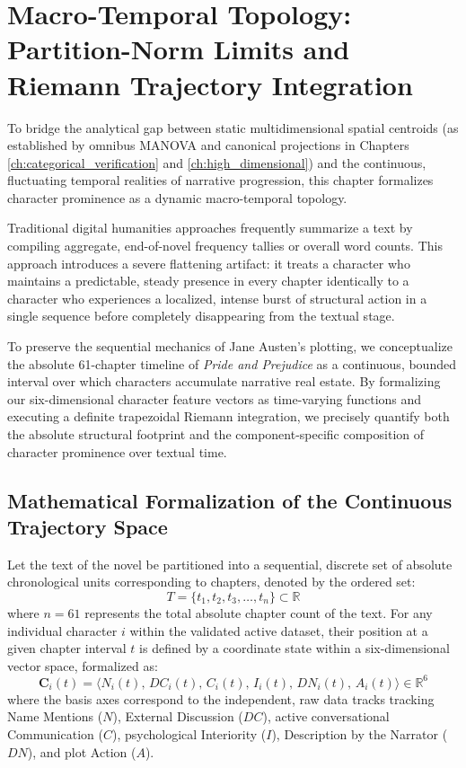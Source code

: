 \chapter{Macro-Temporal Topology: Partition-Norm Limits and Riemann Trajectory Integration}
\label{ch:riemann_calculus}

To bridge the analytical gap between static multidimensional spatial centroids (as established by omnibus MANOVA and canonical projections in Chapters \ref{ch:categorical_verification} and \ref{ch:high_dimensional}) and the continuous, fluctuating temporal realities of narrative progression, this chapter formalizes character prominence as a dynamic macro-temporal topology. 

Traditional digital humanities approaches frequently summarize a text by compiling aggregate, end-of-novel frequency tallies or overall word counts. This approach introduces a severe flattening artifact: it treats a character who maintains a predictable, steady presence in every chapter identically to a character who experiences a localized, intense burst of structural action in a single sequence before completely disappearing from the textual stage. 

To preserve the sequential mechanics of Jane Austen's plotting, we conceptualize the absolute 61-chapter timeline of \textit{Pride and Prejudice} as a continuous, bounded interval over which characters accumulate narrative real estate. By formalizing our six-dimensional character feature vectors as time-varying functions and executing a definite trapezoidal Riemann integration, we precisely quantify both the absolute structural footprint and the component-specific composition of character prominence over textual time.

\section{Mathematical Formalization of the Continuous Trajectory Space}
Let the text of the novel be partitioned into a sequential, discrete set of absolute chronological units corresponding to chapters, denoted by the ordered set:
\begin{equation}
T = \{t_1, t_2, t_3, \dots, t_n\} \subset \mathbb{R}
\end{equation}
where $n = 61$ represents the total absolute chapter count of the text. For any individual character $i$ within the validated active dataset, their position at a given chapter interval $t$ is defined by a coordinate state within a six-dimensional vector space, formalized as:
\begin{equation}
\mathbf{C}_{i}(t) = \langle N_i(t), \, DC_i(t), \, C_i(t), \, I_i(t), \, DN_i(t), \, A_i(t) \rangle \in \mathbb{R}^6
\end{equation}
where the basis axes correspond to the independent, raw data tracks tracking Name Mentions ($N$), External Discussion ($DC$), active conversational Communication ($C$), psychological Interiority ($I$), Description by the Narrator ($DN$), and plot Action ($A$). 

